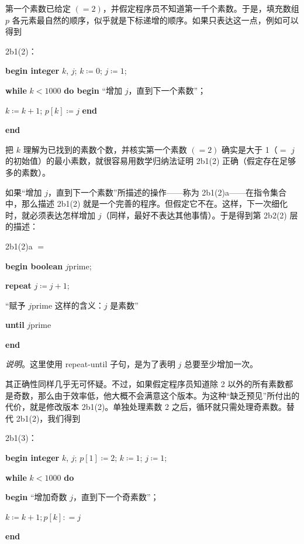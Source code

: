 \documentclass[twoside,11pt,fontset=none]{ctexbook}
\begin{document}
第一个素数已给定 $(=2)$，并假定程序员不知道第一千个素数。于是，填充数组 $p$ 各元素最自然的顺序，似乎就是下标递增的顺序。如果只表达这一点，例如可以得到

\noindent
2b1(2)：

\noindent
\textbf{begin integer} $k$, $j$; $k \coloneq 0$; $j \coloneq 1$;

\noindent
\quad \textbf{while} $k < 1000$ \textbf{do begin} “增加 $j$，直到下一个素数”；

\noindent
\quad\quad $k \coloneq k + 1$; $p[k] \coloneq j$ \textbf{end}

\noindent
\textbf{end}

把 $k$ 理解为已找到的素数个数，并核实第一个素数 $(=2)$ 确实是大于 1（$=$ $j$ 的初始值）的最小素数，就很容易用数学归纳法证明 2b1(2) 正确（假定存在足够多的素数）。

如果“增加 $j$，直到下一个素数”所描述的操作——称为 2b1(2)a——在指令集合中，那么描述 2b1(2) 就是一个完善的程序。但假定它不在。这样，下一次细化时，就必须表达怎样增加 $j$（同样，最好不表达其他事情）。于是得到第 2b2(2) 层的描述：

\noindent
2b1(2)a $=$

\noindent
\textbf{begin boolean} $j$prime;

\noindent
\quad \textbf{repeat} $j \coloneq j + 1$;

\noindent
\quad\quad “赋予 $j$prime 这样的含义：$j$ 是素数”

\noindent
\quad \textbf{until} $j$prime

\noindent
\textbf{end}

\noindent
\textit{说明}。这里使用 repeat-until 子句，是为了表明 $j$ 总要至少增加一次。

其正确性同样几乎无可怀疑。不过，如果假定程序员知道除 2 以外的所有素数都是奇数，那么由于效率低，他大概不会满意这个版本。为这种“缺乏预见”所付出的代价，就是修改版本 2b1(2)。单独处理素数 2 之后，循环就只需处理奇素数。替代 2b1(2)，我们得到

\noindent
2b1(3)：

\noindent
\textbf{begin integer} $k$, $j$; $p[1] \coloneq 2$; $k \coloneq 1$; $j \coloneq 1$;

\noindent
\quad\textbf{while} $k < 1000$ \textbf{do}

\noindent
\quad\quad\textbf{begin} “增加奇数 $j$，直到下一个奇素数”；

\noindent
\quad\quad\quad $k \coloneq k + 1; p[k]: = j$

\noindent
\quad\quad\textbf{end}
\end{document}
